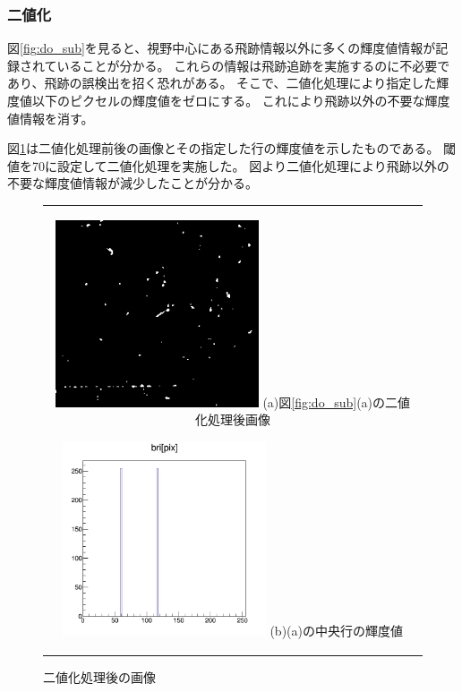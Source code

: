 \documentclass[12pt,a4paper]{jarticle}
\begin{document}
\subsubsection{二値化}
図\ref{fig:do_sub}を見ると、視野中心にある飛跡情報以外に多くの輝度値情報が記録されていることが分かる。
これらの情報は飛跡追跡を実施するのに不必要であり、飛跡の誤検出を招く恐れがある。
そこで、二値化処理により指定した輝度値以下のピクセルの輝度値をゼロにする。
これにより飛跡以外の不要な輝度値情報を消す。
\par
図\ref{fig:do_thre}は二値化処理前後の画像とその指定した行の輝度値を示したものである。
閾値を70に設定して二値化処理を実施した。
図より二値化処理により飛跡以外の不要な輝度値情報が減少したことが分かる。
\begin{figure}[htbp]
  \centering
      \begin{tabular}{c}
        \begin{minipage}{0.5\hsize}
          \centering
            \includegraphics[clip, width=60mm]{thre.png}
            \hspace{1.6cm} (a)図\ref{fig:do_sub}(a)の二値化処理後画像
        \end{minipage}

        \begin{minipage}{0.5\hsize}
          \centering
            \includegraphics[clip, width=60mm]{thre_hist.png}
            \hspace{1.6cm} (b)(a)の中央行の輝度値
        \end{minipage}
    
      \end{tabular}
      \caption{二値化処理後の画像\label{fig:do_thre}}
\end{figure}
\end{document}
